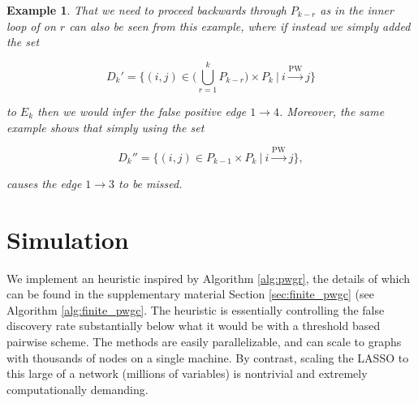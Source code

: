 \documentclass{statsoc}
\def\pwgc{\overset{\text{PW}}{\rightarrow}}  %
\newtheorem{example}{Example}
\begin{document}
\begin{example}
  That we need to proceed backwards through $P_{k - r}$ as in the
  inner loop of on $r$ can also be seen from this example, where if
  instead we simply added the set

  \begin{equation*}
    D_k' = \{(i, j) \in \Big(\bigcup_{r = 1}^k P_{k - r}\Big) \times P_k\ |\ i \pwgc j \}
  \end{equation*}

  to $E_k$ then we would infer the false positive edge
  $1 \rightarrow 4$.  Moreover, the same example shows that simply
  using the set

  \begin{equation*}
    D_k'' = \{(i, j) \in P_{k - 1} \times P_k\ |\ i \pwgc j \}  ,
  \end{equation*}

  causes the edge $1 \rightarrow 3$ to be missed.
\end{example}




\section{Simulation}
\label{sec:simulation}
We implement an heuristic inspired by Algorithm \ref{alg:pwgr}, the
details of which can be found in the supplementary material Section
\ref{sec:finite_pwgc} (see Algorithm \ref{alg:finite_pwgc}.  The
heuristic is essentially controlling the false discovery rate
substantially below what it would be with a threshold based pairwise
scheme.  The methods are easily parallelizable, and can scale to
graphs with thousands of nodes on a single machine.  By contrast,
scaling the LASSO to this large of a network (millions of variables)
is nontrivial and extremely computationally demanding.
\end{document}
